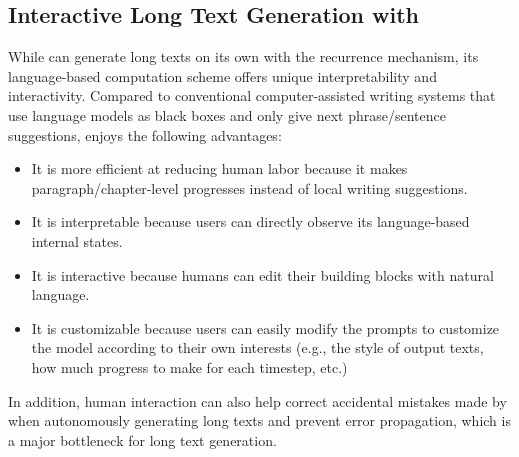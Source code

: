 \subsection{Interactive Long Text Generation with \baby}

While \baby can generate long texts on its own with the recurrence mechanism, its language-based computation scheme offers unique interpretability and interactivity. Compared to conventional computer-assisted writing systems that use language models as black boxes and only give next phrase/sentence suggestions, \baby enjoys the following advantages:
\begin{itemize}
    \item It is more efficient at reducing human labor because it makes paragraph/chapter-level progresses instead of local writing suggestions.
    \item It is interpretable because users can directly observe its language-based internal states.
    \item It is interactive because humans can edit their building blocks with natural language.
    \item It is customizable because users can easily modify the prompts to customize the model according to their own interests (e.g., the style of output texts, how much progress to make for each timestep, etc.)
\end{itemize}
In addition, human interaction can also help correct accidental mistakes made by \baby when autonomously generating long texts and prevent error propagation, which is a major bottleneck for long text generation. 
